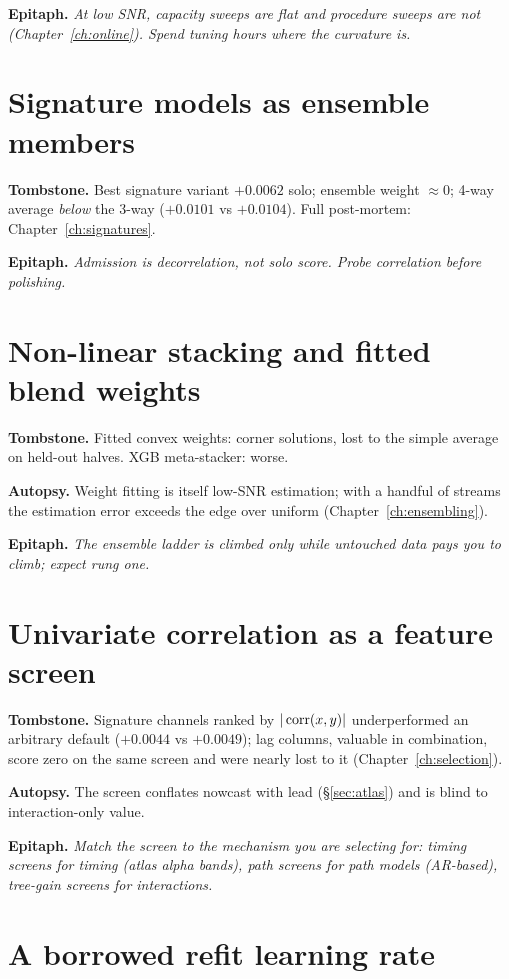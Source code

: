 \textbf{Epitaph.} \emph{At low SNR, capacity sweeps are flat and
procedure sweeps are not (Chapter~\ref{ch:online}). Spend tuning hours
where the curvature is.}

\section{Signature models as ensemble members}

\textbf{Tombstone.} Best signature variant $+0.0062$ solo; ensemble
weight $\approx 0$; 4-way average \emph{below} the 3-way ($+0.0101$ vs
$+0.0104$). Full post-mortem: Chapter~\ref{ch:signatures}.

\textbf{Epitaph.} \emph{Admission is decorrelation, not solo score. Probe
correlation before polishing.}

\section{Non-linear stacking and fitted blend weights}

\textbf{Tombstone.} Fitted convex weights: corner solutions, lost to the
simple average on held-out halves. XGB meta-stacker: worse.

\textbf{Autopsy.} Weight fitting is itself low-SNR estimation; with a
handful of streams the estimation error exceeds the edge over uniform
(Chapter~\ref{ch:ensembling}).

\textbf{Epitaph.} \emph{The ensemble ladder is climbed only while
untouched data pays you to climb; expect rung one.}

\section{Univariate correlation as a feature screen}

\textbf{Tombstone.} Signature channels ranked by $|\operatorname{corr}(x, y)|$
underperformed an arbitrary default ($+0.0044$ vs $+0.0049$); lag
columns, valuable in combination, score zero on the same screen and were
nearly lost to it (Chapter~\ref{ch:selection}).

\textbf{Autopsy.} The screen conflates nowcast with lead
(\S\ref{sec:atlas}) and is blind to interaction-only value.

\textbf{Epitaph.} \emph{Match the screen to the mechanism you are
selecting for: timing screens for timing (atlas alpha bands), path
screens for path models (AR-based), tree-gain screens for interactions.}

\section{A borrowed refit learning rate}

